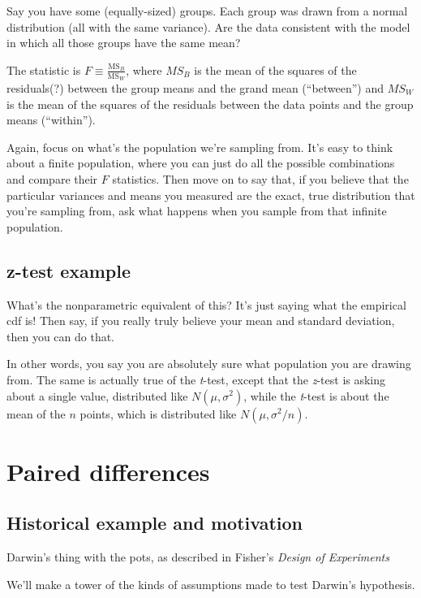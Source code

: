\documentclass{book}
\begin{document}
Say you have some (equally-sized) groups. Each group was drawn from a
normal distribution (all with the same variance). Are the data
consistent with the model in which all those groups have the same mean?

The statistic is \(F \equiv \frac{\mathrm{MS}_B}{\mathrm{MS}_W}\), where
\(MS_B\) is the mean of the squares of the residuals(?) between the
group means and the grand mean (``between'') and \(MS_W\) is the mean of
the squares of the residuals between the data points and the group means
(``within'').

Again, focus on what's the population we're sampling from. It's easy to
think about a finite population, where you can just do all the possible
combinations and compare their \(F\) statistics. Then move on to say
that, if you believe that the particular variances and means you
measured are the exact, true distribution that you're sampling from, ask
what happens when you sample from that infinite population.

\subsection{z-test example}\label{z-test-example}

What's the nonparametric equivalent of this? It's just saying what the
empirical cdf is! Then say, if you really truly believe your mean and
standard deviation, then you can do that.

In other words, you say you are absolutely sure what population you are
drawing from. The same is actually true of the \emph{t}-test, except
that the \emph{z}-test is asking about a single value, distributed like
\(N(\mu, \sigma^2)\), while the \emph{t}-test is about the mean of the
\(n\) points, which is distributed like \(N(\mu, \sigma^2/n)\).

\section{Paired differences}\label{paired-differences}

\subsection{Historical example and
motivation}\label{historical-example-and-motivation}

Darwin's thing with the pots, as described in Fisher's \emph{Design of
Experiments}

We'll make a tower of the kinds of assumptions made to test Darwin's
hypothesis.
\end{document}
